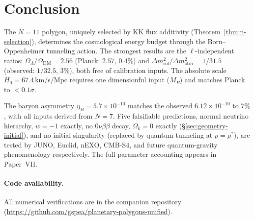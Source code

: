 \section{Conclusion}
\label{sec:conclusion}

The $N = 11$ polygon, uniquely selected by KK flux additivity
(Theorem~\ref{thm:n-selection}), determines the cosmological
energy budget through the Born--Oppenheimer tunneling action.
The strongest results are the $\ell$-independent ratios:
$\Omega_\Lambda/\Omega_{\mathrm{DM}} = 2.56$
(Planck: $2.57$, $0.4\%$) and
$\Delta m^2_{\mathrm{sol}}/\Delta m^2_{\mathrm{atm}} = 1/31.5$
(observed: $1/32.5$, $3\%$), both free of calibration inputs.
The absolute scale $H_0 = 67.4$\,km/s/Mpc requires one
dimensionful input ($M_P$) and matches Planck to $< 0.1\sigma$.

The baryon asymmetry
$\eta_B = 5.7 \times 10^{-10}$ matches the observed
$6.12 \times 10^{-10}$ to $7\%$, with all inputs
derived from $N = 7$.
Five falsifiable predictions, normal neutrino hierarchy,
$w = -1$ exactly, no $0\nu\beta\beta$ decay,
$\Omega_k = 0$ exactly (\S\ref{sec:geometry-initial}),
and no initial singularity
(replaced by quantum tunneling at $\rho = \rho^*$), are
tested by JUNO, Euclid, nEXO, CMB-S4, and future
quantum-gravity phenomenology respectively.
The full parameter accounting appears in Paper~VII.

\paragraph{Code availability.}
All numerical verifications are in the companion repository
(\url{https://github.com/gspea/planetary-polygons-unified}).






